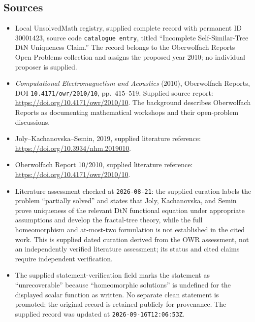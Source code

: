 \documentclass[11pt]{article}
\begin{document}
\subsection{Sources}
\begin{itemize}
\item Local UnsolvedMath registry, supplied complete record with permanent ID \(30001423\), source code \texttt{catalogue entry}, titled ``Incomplete Self-Similar-Tree DtN Uniqueness Claim.'' The record belongs to the Oberwolfach Reports Open Problems collection and assigns the proposed year 2010; no individual proposer is supplied.
\item \emph{Computational Electromagnetism and Acoustics} (2010), Oberwolfach Reports, DOI \texttt{10.4171/owr/2010/10}, pp.\ 415--519. Supplied source report: \url{https://doi.org/10.4171/owr/2010/10}. The background describes Oberwolfach Reports as documenting mathematical workshops and their open-problem discussions.
\item Joly--Kachanovska--Semin, 2019, supplied literature reference: \url{https://doi.org/10.3934/nhm.2019010}.
\item Oberwolfach Report 10/2010, supplied literature reference: \url{https://doi.org/10.4171/owr/2010/10}.
\item Literature assessment checked at \texttt{2026-08-21}: the supplied curation labels the problem ``partially solved'' and states that Joly, Kachanovska, and Semin prove uniqueness of the relevant DtN functional equation under appropriate assumptions and develop the fractal-tree theory, while the full homeomorphism and at-most-two formulation is not established in the cited work. This is supplied dated curation derived from the OWR assessment, not an independently verified literature assessment; its status and cited claims require independent verification.
\item The supplied statement-verification field marks the statement as ``unrecoverable'' because ``homeomorphic solutions'' is undefined for the displayed scalar function as written. No separate clean statement is promoted; the original record is retained publicly for provenance. The supplied record was updated at \texttt{2026-09-16T12:06:53Z}.
\end{itemize}
\end{document}
